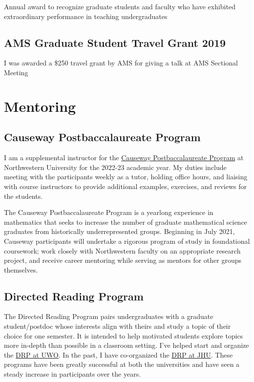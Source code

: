 \documentclass[
]{report}
\begin{document}
Annual award to recognize graduate students and faculty who have exhibited extraordinary performance in teaching undergraduates

\hypertarget{ams-graduate-student-travel-grant-2019}{%
\section{AMS Graduate Student Travel Grant 2019}\label{ams-graduate-student-travel-grant-2019}}

I was awarded a \$250 travel grant by AMS for giving a talk at AMS Sectional Meeting

\hypertarget{mentoring}{%
\chapter{Mentoring}\label{mentoring}}

\hypertarget{causeway-postbaccalaureate-program}{%
\section{Causeway Postbaccalaureate Program}\label{causeway-postbaccalaureate-program}}

I am a supplemental instructor for the \href{https://sites.northwestern.edu/causeway/}{Causeway Postbaccalaureate Program}
at Northwestern University for the 2022-23 academic year.
My duties include meeting with the participants weekly as a tutor, holding office hours, and liaising with course instructors to provide additional examples, exercises, and reviews for the students.

The Causeway Postbaccalaureate Program is a yearlong experience in mathematics that seeks to increase the number of graduate mathematical science graduates from historically underrepresented groups. Beginning in July 2021, Causeway participants will undertake a rigorous program of study in foundational coursework; work closely with Northwestern faculty on an appropriate research project, and receive career mentoring while serving as mentors for other groups themselves.

\hypertarget{directed-reading-program}{%
\section{Directed Reading Program}\label{directed-reading-program}}

The Directed Reading Program pairs undergraduates with a graduate student/postdoc whose interests align with theirs and study a topic of their choice for one semester. It is intended to help motivated students explore topics more in-depth than possible in a classroom setting. I've helped start and organize the \href{https://www.math.uwo.ca/undergraduate/current_students/directed_reading_program.html}{DRP at UWO}. In the past, I have co-organized the \href{https://math.jhu.edu/drp.html}{DRP at JHU}.
These programs have been greatly successful at both the universities and have seen a steady increase in participants over the years.
\end{document}
